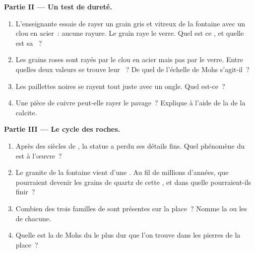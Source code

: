 \begin{problem}
\medskip
\noindent\textbf{Partie II --- Un test de dureté.}
\begin{enumerate}[resume]
  \item L'enseignante essaie de rayer un grain gris et vitreux de la
        fontaine avec un clou en acier~: aucune rayure. Le grain raye le
        verre. Quel est ce , et quelle est sa ~?
  \item Les grains roses sont rayés par le clou en acier mais pas par le
        verre. Entre quelles deux valeurs se trouve leur ~? De quel
         de l'échelle de Mohs s'agit-il~?
  \item Les paillettes noires se rayent tout juste avec un ongle. Quel
         est-ce~?
  \item Une pièce de cuivre peut-elle rayer le pavage~? Explique à l'aide
        de la  de la calcite.
\end{enumerate}

\medskip
\noindent\textbf{Partie III --- Le cycle des roches.}
\begin{enumerate}[resume]
  \item Après des siècles de , la statue a perdu ses détails fins.
        Quel phénomène du  est à l'œuvre~?
  \item Le granite de la fontaine vient d'une . Au fil de millions
        d'années, que pourraient devenir les grains de quartz de cette
        , et dans quelle  pourraient-ils finir~?
  \item Combien des trois familles de  sont présentes sur la
        place~? Nomme la ou les  de chacune.
  \item Quelle est la  de Mohs du  le plus dur que l'on trouve
        dans les pierres de la place~?
\end{enumerate}
\end{problem}
